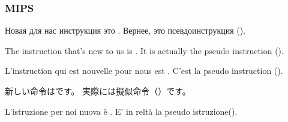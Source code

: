 ﻿\subsubsection{MIPS}

\ifdefined\RUSSIAN


Новая для нас инструкция это . Вернее, это псевдоинструкция ().
\fi

\ifdefined\ENGLISH


The instruction that's new to us is . It is actually the pseudo instruction ().
\fi

\ifdefined\FRENCH


L'instruction qui est nouvelle pour nous est . C'est la pseudo instruction ().
\fi

\ifdefined\JAPANESE


新しい命令はです。 実際には擬似命令（）です。
\fi

\ifdefined\ITALIAN


L'istruzione per noi nuova è . E' in reltà la pseudo istruzione().
\fi

